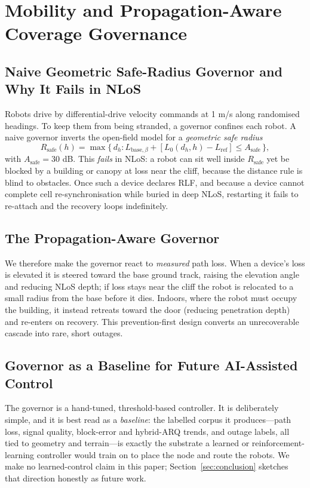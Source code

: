 \documentclass[conference]{IEEEtran}
\begin{document}
\section{Mobility and Propagation-Aware Coverage Governance}
\label{sec:gov}

\subsection{Naive Geometric Safe-Radius Governor and Why It Fails in NLoS}
Robots drive by differential-drive velocity commands at 1 m/s along randomised
headings. To keep them from being stranded, a governor confines each robot. A naive
governor inverts the open-field model for a \emph{geometric safe radius}
\begin{equation}
\label{eq:rsafe}
R_{\mathrm{safe}}(h)=\max\{\,d_h : L_{\mathrm{base},\beta}+[L_0(d_h,h)-L_{\mathrm{ref}}]
\le A_{\mathrm{safe}}\,\},
\end{equation}
with $A_{\mathrm{safe}}=30$ dB. This \emph{fails} in NLoS: a robot can sit well inside
$R_{\mathrm{safe}}$ yet be blocked by a building or canopy at loss near the cliff,
because the distance rule is blind to obstacles. Once such a device declares RLF, and
because a device cannot complete cell re-synchronisation while buried in deep NLoS,
restarting it fails to re-attach and the recovery loops indefinitely.

\subsection{The Propagation-Aware Governor}
We therefore make the governor react to \emph{measured} path loss. When a device's
loss is elevated it is steered toward the base ground track, raising the elevation
angle and reducing NLoS depth; if loss stays near the cliff the robot is relocated to
a small radius from the base before it dies. Indoors, where the robot must occupy the
building, it instead retreats toward the door (reducing penetration depth) and
re-enters on recovery. This prevention-first design converts an unrecoverable cascade
into rare, short outages.

\subsection{Governor as a Baseline for Future AI-Assisted Control}
The governor is a hand-tuned, threshold-based controller. It is deliberately simple,
and it is best read as a \emph{baseline}: the labelled corpus it produces---path loss,
signal quality, block-error and hybrid-ARQ trends, and outage labels, all tied to
geometry and terrain---is exactly the substrate a learned or reinforcement-learning
controller would train on to place the node and route the robots. We make no learned-control
claim in this paper; Section~\ref{sec:conclusion} sketches that direction honestly as
future work.
\end{document}
